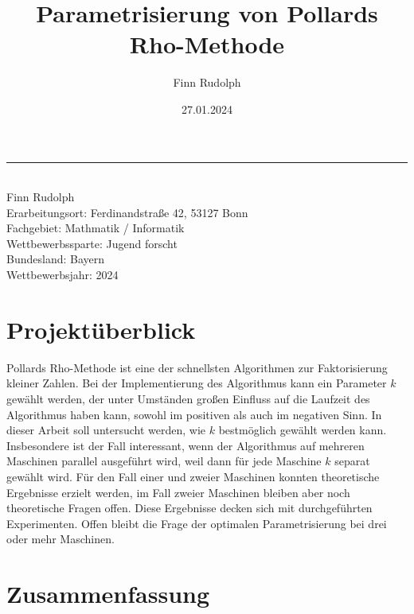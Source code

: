 \documentclass[a4paper, 10pt, ngerman]{article}
\title{Parametrisierung von Pollards Rho-Methode}
\author{Finn Rudolph}
\date{27.01.2024}
\begin{document}
\begin{titlepage}

    \noindent\rule{\textwidth}{0.4pt}

    \makeatletter
    \begin{flushleft}
        \textbf{\LARGE{\@title}} \\
        \vspace{1.5em}
        Finn Rudolph \\
        \vspace{1em}
        Erarbeitungsort: Ferdinandstraße 42, 53127 Bonn \\
        Fachgebiet: Mathmatik / Informatik \\
        Wettbewerbssparte: Jugend forscht \\
        Bundesland: Bayern \\
        Wettbewerbsjahr: 2024
    \end{flushleft}

    \vspace{0.5em}

    \section*{Projektüberblick}

    Pollards Rho-Methode ist eine der schnellsten Algorithmen zur Faktorisierung kleiner Zahlen. Bei der Implementierung des Algorithmus kann ein Parameter $k$ gewählt werden, der unter Umständen großen Einfluss auf die Laufzeit des Algorithmus haben kann, sowohl im positiven als auch im negativen Sinn. In dieser Arbeit soll untersucht werden, wie $k$ bestmöglich gewählt werden kann. Insbesondere ist der Fall interessant, wenn der Algorithmus auf mehreren Maschinen parallel ausgeführt wird, weil dann für jede Maschine $k$ separat gewählt wird. Für den Fall einer und zweier Maschinen konnten theoretische Ergebnisse erzielt werden, im Fall zweier Maschinen bleiben aber noch theoretische Fragen offen. Diese Ergebnisse decken sich mit durchgeführten Experimenten. Offen bleibt die Frage der optimalen Parametrisierung bei drei oder mehr Maschinen.

    \tableofcontents

    \thispagestyle{empty}

\end{titlepage}

\newpage

\section{Zusammenfassung}
\end{document}
